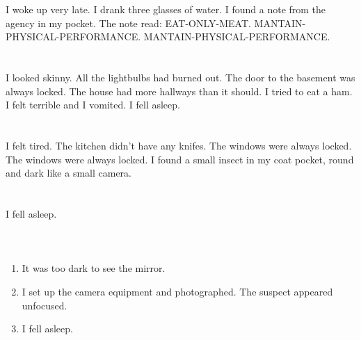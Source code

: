 \documentclass{article}
\begin{document}
    \section{}
    I woke up very late. I drank three glasses of water. I found a note from the agency in my pocket. The note read: EAT-ONLY-MEAT. MANTAIN-PHYSICAL-PERFORMANCE. MANTAIN-PHYSICAL-PERFORMANCE.  
    \newpage
    
    \section{}
    I looked skinny. All the lightbulbs had burned out. The door to the basement was always locked. The house had more hallways than it should. I tried to eat a ham. I felt terrible and I vomited. I fell asleep.  
    \newpage
    
    \section{}
    I felt tired. The kitchen didn't have any knifes. The windows were always locked. The windows were always locked. I found a small insect in my coat pocket, round and dark like a small camera.  
    \newpage
    
    \section{}
    I fell asleep.\\\\ 
    \newpage
    
    \section{}
    
    \begin{enumerate}
    
    \item It was too dark to see the mirror.\\
    
    \item I set up the camera equipment and photographed. The suspect appeared unfocused.\\
    
    \item I fell asleep.\\
    
    \end{enumerate}
     
\end{document}
